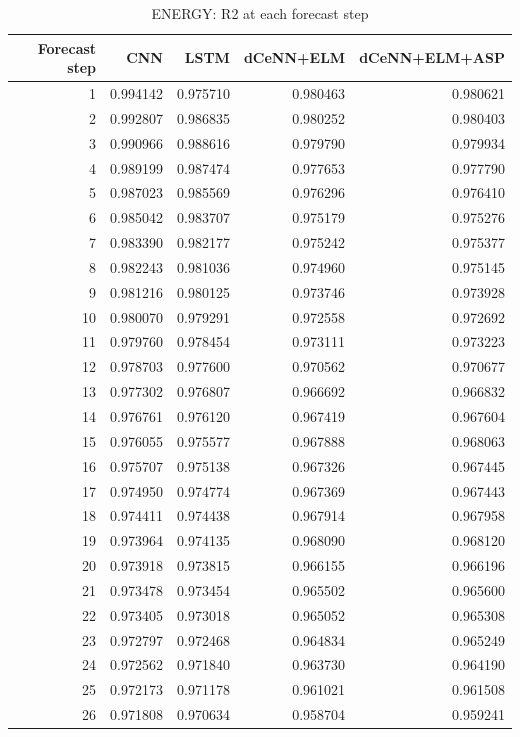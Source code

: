 \begin{table}
\caption{ENERGY: R2 at each forecast step}
\begin{tabular}{rrrrr}
\toprule
Forecast step & CNN & LSTM & dCeNN+ELM & dCeNN+ELM+ASP \\
\midrule
1 & 0.994142 & 0.975710 & 0.980463 & 0.980621 \\
2 & 0.992807 & 0.986835 & 0.980252 & 0.980403 \\
3 & 0.990966 & 0.988616 & 0.979790 & 0.979934 \\
4 & 0.989199 & 0.987474 & 0.977653 & 0.977790 \\
5 & 0.987023 & 0.985569 & 0.976296 & 0.976410 \\
6 & 0.985042 & 0.983707 & 0.975179 & 0.975276 \\
7 & 0.983390 & 0.982177 & 0.975242 & 0.975377 \\
8 & 0.982243 & 0.981036 & 0.974960 & 0.975145 \\
9 & 0.981216 & 0.980125 & 0.973746 & 0.973928 \\
10 & 0.980070 & 0.979291 & 0.972558 & 0.972692 \\
11 & 0.979760 & 0.978454 & 0.973111 & 0.973223 \\
12 & 0.978703 & 0.977600 & 0.970562 & 0.970677 \\
13 & 0.977302 & 0.976807 & 0.966692 & 0.966832 \\
14 & 0.976761 & 0.976120 & 0.967419 & 0.967604 \\
15 & 0.976055 & 0.975577 & 0.967888 & 0.968063 \\
16 & 0.975707 & 0.975138 & 0.967326 & 0.967445 \\
17 & 0.974950 & 0.974774 & 0.967369 & 0.967443 \\
18 & 0.974411 & 0.974438 & 0.967914 & 0.967958 \\
19 & 0.973964 & 0.974135 & 0.968090 & 0.968120 \\
20 & 0.973918 & 0.973815 & 0.966155 & 0.966196 \\
21 & 0.973478 & 0.973454 & 0.965502 & 0.965600 \\
22 & 0.973405 & 0.973018 & 0.965052 & 0.965308 \\
23 & 0.972797 & 0.972468 & 0.964834 & 0.965249 \\
24 & 0.972562 & 0.971840 & 0.963730 & 0.964190 \\
25 & 0.972173 & 0.971178 & 0.961021 & 0.961508 \\
26 & 0.971808 & 0.970634 & 0.958704 & 0.959241 \\

\end{tabular}
\end{table}
